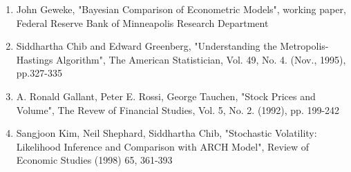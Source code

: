 \documentclass{article}
\begin{document}
\begin{enumerate}
\item
John Geweke, "Bayesian Comparison of Econometric Models", working paper, Federal Reserve Bank of
Minneapolis Research Department
\item
Siddhartha Chib and Edward Greenberg, "Understanding the Metropolis-Hastings Algorithm", The American Statistician, Vol. 49, No. 4. (Nov., 1995), pp.327-335
\item
A. Ronald Gallant, Peter E. Rossi, George Tauchen, "Stock Prices and Volume", The Revew of Financial Studies, Vol. 5, No. 2. (1992), pp. 199-242
\item
Sangjoon Kim, Neil Shephard, Siddhartha Chib, "Stochastic Volatility: Likelihood Inference and Comparison with ARCH Model", Review of Economic Studies (1998) 65, 361-393
\end{enumerate}
\end{document}
